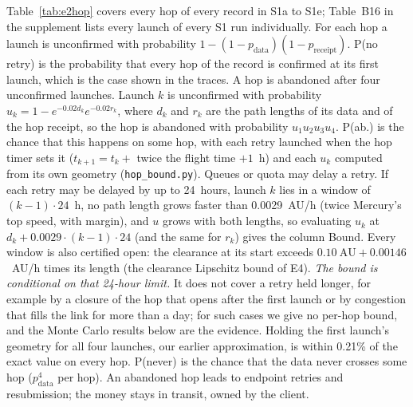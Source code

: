 \documentclass[10pt,letterpaper]{article}
\makeatletter
\renewcommand\paragraph{\@startsection{paragraph}{4}{\z@}{4pt plus 1pt}{-0.6em}{\normalfont\normalsize\bfseries}}
\makeatother
\begin{document}
\paragraph{Backbone.} Table~\ref{tab:e2hop} covers every hop of every record in S1a to S1e;
Table~B16 in the supplement lists every launch of every S1 run individually. For each hop
a launch is unconfirmed with probability $1 - (1 - p_\text{data})(1 - p_\text{receipt})$. P(no retry) is the
probability that every hop of the record is confirmed at its first launch, which is the case shown in the traces. A hop
is abandoned after four unconfirmed launches. Launch $k$ is unconfirmed with probability
$u_k = 1 - e^{-0.02 d_k} e^{-0.02 r_k}$, where $d_k$ and $r_k$ are the path lengths of its data and of the hop receipt,
so the hop is abandoned with probability $u_1 u_2 u_3 u_4$. P(ab.) is the chance that this happens on some hop,
with each retry launched when the hop timer sets it ($t_{k+1} = t_k + $ twice the flight time $+ 1$~h) and each $u_k$
computed from its own geometry (\texttt{hop\_bound.py}). Queues or quota may delay a retry. If each retry may be
delayed by up to 24~hours, launch $k$ lies in a window of $(k-1) \cdot 24$~h, no path length grows faster than
0.0029~AU/h (twice Mercury's top speed, with margin), and $u$ grows with both lengths, so evaluating $u_k$ at
$d_k + 0.0029 \cdot (k-1) \cdot 24$ (and the same for $r_k$) gives the column Bound. Every window is also certified open:
the clearance at its start exceeds $0.10~\text{AU} + 0.00146$~AU/h times its length (the clearance Lipschitz bound
of E4). \emph{The bound is conditional on that 24-hour limit.} It does not cover a retry held longer, for example by a
closure of the hop that opens after the first launch or by congestion that fills the link for more than a day; for
such cases we give no per-hop bound, and the Monte Carlo results below are the evidence. Holding the first launch's geometry for all four launches, our earlier approximation, is within
0.21\% of the exact value on every hop. P(never) is the chance that the data never crosses some hop ($p_\text{data}^4$ per hop).
An abandoned hop leads to endpoint retries and resubmission; the money stays in transit, owned by the client.
\end{document}
